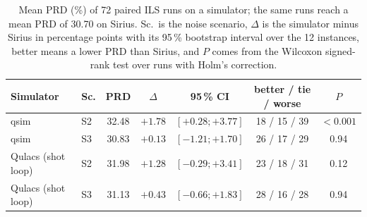 \begin{table}[t]
\caption{Mean PRD (\%) of 72 paired ILS runs on a simulator; the same runs reach a mean PRD of 30.70 on Sirius. Sc.\ is the noise scenario, $\Delta$ is the simulator minus Sirius in percentage points with its 95\,\% bootstrap interval over the 12 instances, better means a lower PRD than Sirius, and $P$ comes from the Wilcoxon signed-rank test over runs with Holm's correction.}
\label{tab:t5}
\centering
\small
\setlength{\tabcolsep}{4pt}
\begin{tabular}{llccccc}
\toprule
Simulator & Sc. & PRD & $\Delta$ & 95\,\% CI & better / tie / worse & $P$ \\
\midrule
qsim & S2 & 32.48 & $+1.78$ & $[+0.28; +3.77]$ & 18 / 15 / 39 & $<0.001$ \\
qsim & S3 & 30.83 & $+0.13$ & $[-1.21; +1.70]$ & 26 / 17 / 29 & 0.94 \\
Qulacs (shot loop) & S2 & 31.98 & $+1.28$ & $[-0.29; +3.41]$ & 23 / 18 / 31 & 0.12 \\
Qulacs (shot loop) & S3 & 31.13 & $+0.43$ & $[-0.66; +1.83]$ & 28 / 16 / 28 & 0.94 \\
\bottomrule
\end{tabular}
\end{table}
